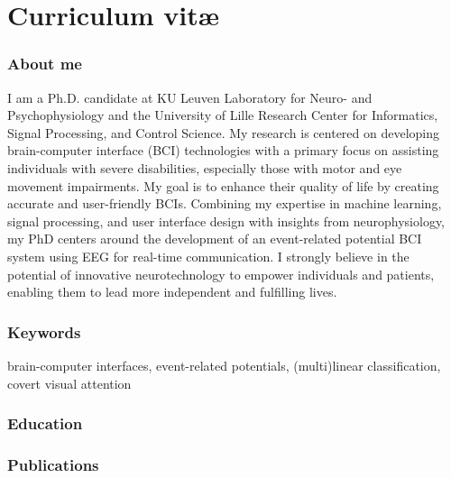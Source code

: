 \chapter{Curriculum vit\ae}

\subsection*{About me}
I am a Ph.D. candidate at KU Leuven Laboratory for Neuro- and Psychophysiology
and the University of Lille Research Center for Informatics, Signal Processing,
and Control Science. My research is centered on developing brain-computer
interface (BCI) technologies with a primary focus on assisting individuals with
severe disabilities, especially those with motor and eye movement impairments.
My goal is to enhance their quality of life by creating accurate and
user-friendly BCIs. Combining my expertise in machine learning, signal
processing, and user interface design with insights from neurophysiology, my
PhD centers around the development of an event-related potential BCI system
using EEG for real-time communication. I strongly believe in the potential of
innovative neurotechnology to empower individuals and patients, enabling them
to lead more independent and fulfilling lives.

\subsection*{Keywords}
brain-computer interfaces, event-related
potentials, (multi)linear classification, covert visual attention

\subsection*{Education}

\begin{cvlist}
\end{cvlist}

\subsection*{Publications}
\nocite{%
	VanDenKerchove2020,
	Libert2022,
	VanDenKerchove2022,
	VanDenKerchove2024,
}
\printbibliography[heading=none, resetnumbers=true]


